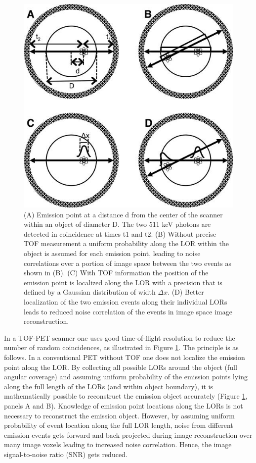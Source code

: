 \begin{figure}[!bhtp]
	\centering
	\includegraphics[scale=0.6]{img/tileshop.jpg}
	\caption{\label{fig.tile} (A) Emission point at a distance d from the center of the scanner within an object of diameter D. The two 511 keV photons are detected in coincidence at times t1 and t2. (B) Without precise TOF measurement a uniform probability along the LOR within the object is assumed for each emission point, leading to noise correlations over a portion of image space between the two events as shown in (B). (C) With TOF information the position of the emission point is localized along the LOR with a precision that is defined by a Gaussian distribution of width $\Delta x$. (D) Better localization of the two emission events along their individual LORs leads to reduced noise correlation of the events in image space image reconstruction. }
\end{figure}

In a TOF-PET scanner one uses good time-of-flight resolution to reduce the number of random coincidences, as illustrated in Figure \ref{fig.tile}. The principle is as follows. In a conventional PET without TOF one does not localize the emission point along the LOR. By collecting all possible LORs around the object (full angular coverage) and assuming uniform probability of the emission points lying along the full length of the LORs (and within object boundary), it is mathematically possible to reconstruct the emission object accurately (Figure \ref{fig.tile}, panels A and B). Knowledge of emission point locations along the LORs is not necessary to reconstruct the emission object. However, by assuming uniform probability of event location along the full LOR length, noise from different emission events gets forward and back projected during image reconstruction over many image voxels leading to increased noise correlation. Hence, the image signal-to-noise ratio (SNR) gets reduced.

